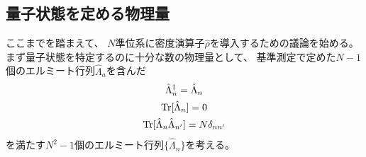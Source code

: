 \documentclass[a4paper, 10pt]{jsarticle}
\begin{document}
\subsection{量子状態を定める物理量} \label{ss:量子状態を定める物理量}
ここまでを踏まえて、
$N$準位系に密度演算子$\hat{\rho}$を導入するための議論を始める。
まず量子状態を特定するのに十分な数の物理量として、
基準測定で定めた$N-1$個のエルミート行列$\hat{\Lambda}_a$を含んだ
\begin{align}
	\begin{gathered}
		\hat{\Lambda}_n^\dagger =\hat{\Lambda}_n \\
		\operatorname*{Tr} [\hat{\Lambda}_n] = 0 \\
		\operatorname*{Tr} [\hat{\Lambda}_n \hat{\Lambda}_{n'}] = N \delta_{nn'}
	\end{gathered} \label{ラムダの条件}
\end{align}
を満たす$N^2 - 1$個のエルミート行列$\{\hat{\Lambda}_n\}$を考える。
\end{document}
